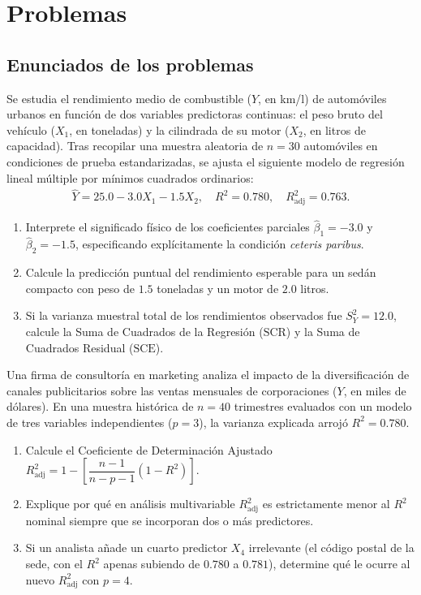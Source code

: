 \section*{Problemas}

\subsection*{Enunciados de los problemas}

\begin{problema}
	\label{prob:0d6ff67}
	Se estudia el rendimiento medio de combustible ($Y$, en km/l) de automóviles urbanos en función de dos variables predictoras continuas: el peso bruto del vehículo ($X_1$, en toneladas) y la cilindrada de su motor ($X_2$, en litros de capacidad). Tras recopilar una muestra aleatoria de $n = 30$ automóviles en condiciones de prueba estandarizadas, se ajusta el siguiente modelo de regresión lineal múltiple por mínimos cuadrados ordinarios:
	\begin{align}
		\hat{Y} = 25.0 - 3.0X_1 - 1.5X_2, \quad R^2 = 0.780, \quad R_{\text{adj}}^2 = 0.763.
	\end{align}
	\begin{enumerate}
		\item Interprete el significado físico de los coeficientes parciales $\hat{\beta}_1 = -3.0$ y $\hat{\beta}_2 = -1.5$, especificando explícitamente la condición \emph{ceteris paribus}.
		\item Calcule la predicción puntual del rendimiento esperable para un sedán compacto con peso de $1.5$ toneladas y un motor de $2.0$ litros.
		\item Si la varianza muestral total de los rendimientos observados fue $S_Y^2 = 12.0$, calcule la Suma de Cuadrados de la Regresión ($\text{SCR}$) y la Suma de Cuadrados Residual ($\text{SCE}$).
	\end{enumerate}
\end{problema}

\begin{problema}
	\label{prob:9f8863e}
	Una firma de consultoría en marketing analiza el impacto de la diversificación de canales publicitarios sobre las ventas mensuales de corporaciones ($Y$, en miles de dólares). En una muestra histórica de $n = 40$ trimestres evaluados con un modelo de tres variables independientes ($p = 3$), la varianza explicada arrojó $R^2 = 0.780$.
	\begin{enumerate}
		\item Calcule el Coeficiente de Determinación Ajustado $R_{\text{adj}}^2 = 1 - \left[\dfrac{n-1}{n-p-1}(1-R^2)\right]$.
		\item Explique por qué en análisis multivariable $R_{\text{adj}}^2$ es estrictamente menor al $R^2$ nominal siempre que se incorporan dos o más predictores.
		\item Si un analista añade un cuarto predictor $X_4$ irrelevante (el código postal de la sede, con el $R^2$ apenas subiendo de $0.780$ a $0.781$), determine qué le ocurre al nuevo $R_{\text{adj}}^2$ con $p=4$.
	\end{enumerate}
\end{problema}

